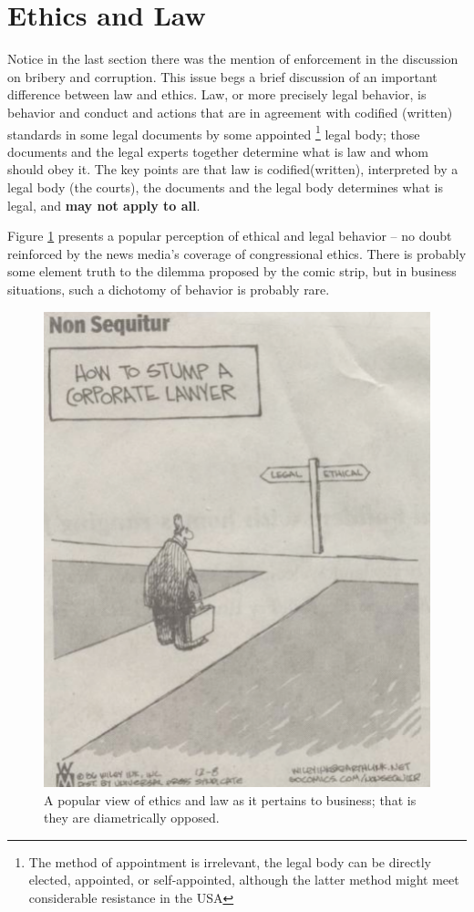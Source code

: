 \section*{Ethics and Law}
Notice in the last section there was the mention of enforcement in the discussion on bribery and corruption.  This issue begs a brief discussion of an important difference between law and ethics.  Law, or more precisely legal behavior, is behavior and conduct and actions that are in agreement with codified (written) standards in some legal documents by some appointed \footnote{The method of appointment is irrelevant, the legal body can be directly elected, appointed, or self-appointed, although the latter method might meet considerable resistance in the USA} 
legal body; those documents and the legal experts together determine what is law and whom should obey it.  The key points are that law is codified(written), interpreted by a legal body (the courts), the
documents and the legal body determines what is legal, and \textbf{may not apply to all}.

Figure   \ref{fig:ethics_and_law} presents a popular perception of ethical and legal behavior -- no doubt reinforced by the news media's coverage of congressional ethics.    There is probably some element truth to the dilemma proposed by the comic strip, but in business situations, such a dichotomy of behavior is probably rare.

\begin{figure}[ht!] %
   \centering
   \includegraphics[width=5in]{./figures/ethics_and_law.pdf} 
   \caption{A popular view of ethics and law as it pertains to business; that is they are diametrically opposed.}
   \label{fig:ethics_and_law}
\end{figure}

